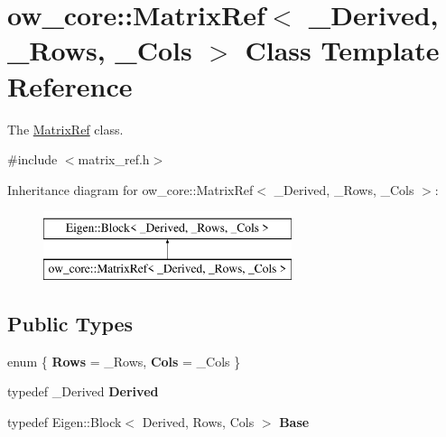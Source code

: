 \hypertarget{classow__core_1_1MatrixRef}{}\section{ow\+\_\+core\+:\+:Matrix\+Ref$<$ \+\_\+\+Derived, \+\_\+\+Rows, \+\_\+\+Cols $>$ Class Template Reference}
\label{classow__core_1_1MatrixRef}


The \hyperlink{classow__core_1_1MatrixRef}{Matrix\+Ref} class.  




{\ttfamily \#include $<$matrix\+\_\+ref.\+h$>$}

Inheritance diagram for ow\+\_\+core\+:\+:Matrix\+Ref$<$ \+\_\+\+Derived, \+\_\+\+Rows, \+\_\+\+Cols $>$\+:\begin{figure}[H]
\begin{center}
\leavevmode
\includegraphics[height=2.000000cm]{df/dd7/classow__core_1_1MatrixRef}
\end{center}
\end{figure}
\subsection*{Public Types}
\begin{DoxyCompactItemize}
\item 
enum \{ {\bfseries Rows} = \+\_\+\+Rows, 
{\bfseries Cols} = \+\_\+\+Cols
 \}\hypertarget{classow__core_1_1MatrixRef_acbc53f5a50649a21caafebc91966f6d3}{}\label{classow__core_1_1MatrixRef_acbc53f5a50649a21caafebc91966f6d3}

\item 
typedef \+\_\+\+Derived {\bfseries Derived}\hypertarget{classow__core_1_1MatrixRef_ad0e55e853d08951e064718a8ac69ac96}{}\label{classow__core_1_1MatrixRef_ad0e55e853d08951e064718a8ac69ac96}

\item 
typedef Eigen\+::\+Block$<$ Derived, Rows, Cols $>$ {\bfseries Base}\hypertarget{classow__core_1_1MatrixRef_a2b935d9a0c707f1d2f709829413a75a4}{}\label{classow__core_1_1MatrixRef_a2b935d9a0c707f1d2f709829413a75a4}

\end{DoxyCompactItemize}
